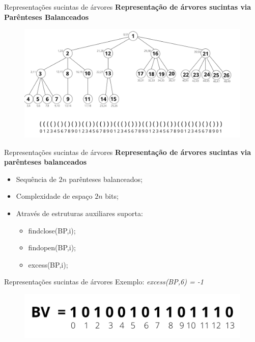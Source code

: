 \begin{frame}{Representações sucintas de árvores}
    \textbf{Representação de árvores sucintas via Parênteses Balanceados}
        \begin{figure}[h!]
            \centering
            
            \includegraphics[scale=0.37]{images/arvore_geral.png}
        \end{figure} 
\end{frame}

\begin{frame}{Representações sucintas de árvores}
    \textbf{Representação de árvores sucintas via parênteses balanceados}
        \begin{itemize}
            \item Sequência de $2n$ parênteses balanceados;
            \item Complexidade de espaço $2n$ bits;
            \item Através de estruturas auxiliares suporta:
            \begin{itemize}
                \item findclose(BP,i);
                \item findopen(BP,i);
                \item excess(BP,i);
            \end{itemize}
        \end{itemize}
    \end{frame}
    
    \begin{frame}{Representações sucintas de árvores}
    Exemplo: \textit{excess(BP,6) = -1}
        \begin{figure}[h!]
            \centering
            
            \includegraphics[scale=0.5]{images/bitvector.png}
        \end{figure} 
\end{frame}